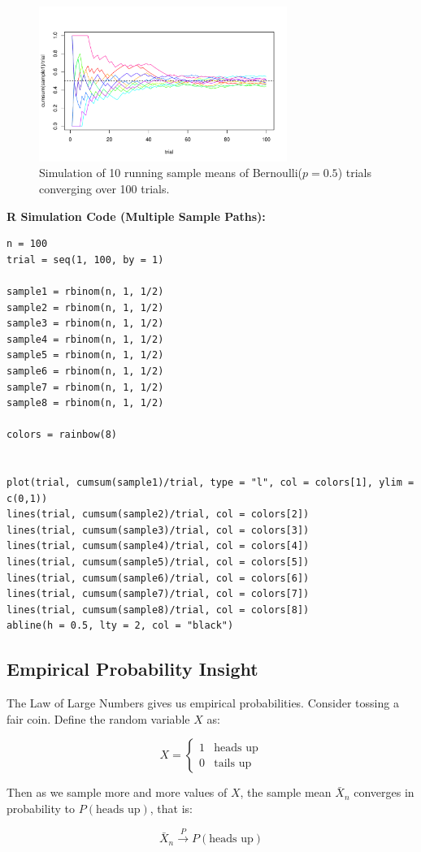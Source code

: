 \begin{figure}[H]
  \centering
  \includegraphics[width=0.72\textwidth]{Section5/images/simulation_multi.pdf}
  \caption{Simulation of 10 running sample means of Bernoulli(\(p = 0.5\)) trials converging over 100 trials.}
\end{figure}


\noindent\textbf{R Simulation Code (Multiple Sample Paths):}
\begin{tcolorbox}[
    colback=gray!10,
    colframe=black!45,
    arc=2mm,
    enhanced,
    breakable,
    width=1.05\textwidth,
    enlarge left by=-1.5em,
    boxsep=0pt,
    left=6pt,   %
    right=0pt,
    top=2pt,
    bottom=2pt
]
\begin{verbatim}
n = 100
trial = seq(1, 100, by = 1)

sample1 = rbinom(n, 1, 1/2)
sample2 = rbinom(n, 1, 1/2)
sample3 = rbinom(n, 1, 1/2)
sample4 = rbinom(n, 1, 1/2)
sample5 = rbinom(n, 1, 1/2)
sample6 = rbinom(n, 1, 1/2)
sample7 = rbinom(n, 1, 1/2)
sample8 = rbinom(n, 1, 1/2)

colors = rainbow(8)


plot(trial, cumsum(sample1)/trial, type = "l", col = colors[1], ylim = c(0,1))
lines(trial, cumsum(sample2)/trial, col = colors[2])
lines(trial, cumsum(sample3)/trial, col = colors[3])
lines(trial, cumsum(sample4)/trial, col = colors[4])
lines(trial, cumsum(sample5)/trial, col = colors[5])
lines(trial, cumsum(sample6)/trial, col = colors[6])
lines(trial, cumsum(sample7)/trial, col = colors[7])
lines(trial, cumsum(sample8)/trial, col = colors[8])
abline(h = 0.5, lty = 2, col = "black")
\end{verbatim}
\end{tcolorbox}

\subsection*{Empirical Probability Insight}


The Law of Large Numbers gives us empirical probabilities. Consider tossing a fair coin. Define the random variable \( X \) as:

\[
X = \begin{cases}
1 & \text{heads up} \\
0 & \text{tails up}
\end{cases}
\]

Then as we sample more and more values of \( X \), the sample mean \( \bar{X}_n \) converges in probability to \( P(\text{heads up}) \), that is:

\[
\bar{X}_n \xrightarrow{P} P(\text{heads up}) 
\]


